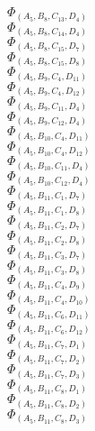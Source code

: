 \documentclass[14pt]{article}
\begin{document}
    $\Phi_{({A}_{5}, {B}_{8}, {C}_{13}, {D}_{4})}$ \\ 
    $\Phi_{({A}_{5}, {B}_{8}, {C}_{14}, {D}_{4})}$ \\ 
    $\Phi_{({A}_{5}, {B}_{8}, {C}_{15}, {D}_{7})}$ \\ 
    $\Phi_{({A}_{5}, {B}_{8}, {C}_{15}, {D}_{8})}$ \\ 
    $\Phi_{({A}_{5}, {B}_{9}, {C}_{4}, {D}_{11})}$ \\ 
    $\Phi_{({A}_{5}, {B}_{9}, {C}_{4}, {D}_{12})}$ \\ 
    $\Phi_{({A}_{5}, {B}_{9}, {C}_{11}, {D}_{4})}$ \\ 
    $\Phi_{({A}_{5}, {B}_{9}, {C}_{12}, {D}_{4})}$ \\ 
    $\Phi_{({A}_{5}, {B}_{10}, {C}_{4}, {D}_{11})}$ \\ 
    $\Phi_{({A}_{5}, {B}_{10}, {C}_{4}, {D}_{12})}$ \\ 
    $\Phi_{({A}_{5}, {B}_{10}, {C}_{11}, {D}_{4})}$ \\ 
    $\Phi_{({A}_{5}, {B}_{10}, {C}_{12}, {D}_{4})}$ \\ 
    $\Phi_{({A}_{5}, {B}_{11}, {C}_{1}, {D}_{7})}$ \\ 
    $\Phi_{({A}_{5}, {B}_{11}, {C}_{1}, {D}_{8})}$ \\ 
    $\Phi_{({A}_{5}, {B}_{11}, {C}_{2}, {D}_{7})}$ \\ 
    $\Phi_{({A}_{5}, {B}_{11}, {C}_{2}, {D}_{8})}$ \\ 
    $\Phi_{({A}_{5}, {B}_{11}, {C}_{3}, {D}_{7})}$ \\ 
    $\Phi_{({A}_{5}, {B}_{11}, {C}_{3}, {D}_{8})}$ \\ 
    $\Phi_{({A}_{5}, {B}_{11}, {C}_{4}, {D}_{9})}$ \\ 
    $\Phi_{({A}_{5}, {B}_{11}, {C}_{4}, {D}_{10})}$ \\ 
    $\Phi_{({A}_{5}, {B}_{11}, {C}_{6}, {D}_{11})}$ \\ 
    $\Phi_{({A}_{5}, {B}_{11}, {C}_{6}, {D}_{12})}$ \\ 
    $\Phi_{({A}_{5}, {B}_{11}, {C}_{7}, {D}_{1})}$ \\ 
    $\Phi_{({A}_{5}, {B}_{11}, {C}_{7}, {D}_{2})}$ \\ 
    $\Phi_{({A}_{5}, {B}_{11}, {C}_{7}, {D}_{3})}$ \\ 
    $\Phi_{({A}_{5}, {B}_{11}, {C}_{8}, {D}_{1})}$ \\ 
    $\Phi_{({A}_{5}, {B}_{11}, {C}_{8}, {D}_{2})}$ \\ 
    $\Phi_{({A}_{5}, {B}_{11}, {C}_{8}, {D}_{3})}$ \\ 
\end{document}
